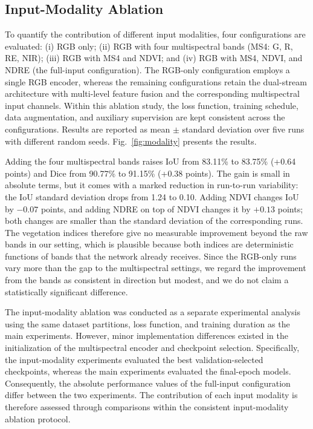 \documentclass[pdflatex,sn-mathphys-num]{sn-jnl}
\newenvironment{revblock}{\color{revisionblue}}{}
\begin{document}
\begin{revblock}
\subsection{Input-Modality Ablation}
\label{sec:modality}

To quantify the contribution of different input
modalities, four configurations are evaluated:
(i) RGB only; (ii) RGB with four multispectral
bands (MS4: G, R, RE, NIR); (iii) RGB with MS4
and NDVI; and (iv) RGB with MS4, NDVI, and NDRE
(the full-input configuration). The RGB-only
configuration employs a single RGB encoder,
whereas the remaining configurations retain
the dual-stream architecture with multi-level
feature fusion and the corresponding
multispectral input channels. Within this
ablation study, the loss function, training
schedule, data augmentation, and auxiliary
supervision are kept consistent across the
configurations. Results are reported as mean
$\pm$ standard deviation over five runs with
different random seeds.
Fig.~\ref{fig:modality} presents the results.


Adding the four multispectral bands raises IoU from 83.11\% to 83.75\% (+0.64 points) and Dice from 90.77\% to 91.15\% (+0.38 points). The gain is small in absolute terms, but it comes with a marked reduction in run-to-run variability: the IoU standard deviation drops from 1.24 to 0.10. Adding NDVI changes IoU by $-0.07$ points, and adding NDRE on top of NDVI changes it by $+0.13$ points; both changes are smaller than the standard deviation of the corresponding runs. The vegetation indices therefore give no measurable improvement beyond the raw bands in our setting, which is plausible because both indices are deterministic functions of bands that the network already receives. Since the RGB-only runs vary more than the gap to the multispectral settings, we regard the improvement from the bands as consistent in direction but modest, and we do not claim a statistically significant difference.


\begin{revblock}
The input-modality ablation was conducted as a
separate experimental analysis using the same
dataset partitions, loss function, and training
duration as the main experiments. However, minor
implementation differences existed in the
initialization of the multispectral encoder and
checkpoint selection. Specifically, the
input-modality experiments evaluated the best
validation-selected checkpoints, whereas the
main experiments evaluated the final-epoch
models. Consequently, the absolute performance
values of the full-input configuration differ
between the two experiments. The contribution
of each input modality is therefore assessed
through comparisons within the consistent
input-modality ablation protocol.
\end{revblock}



\end{revblock}
\end{document}
